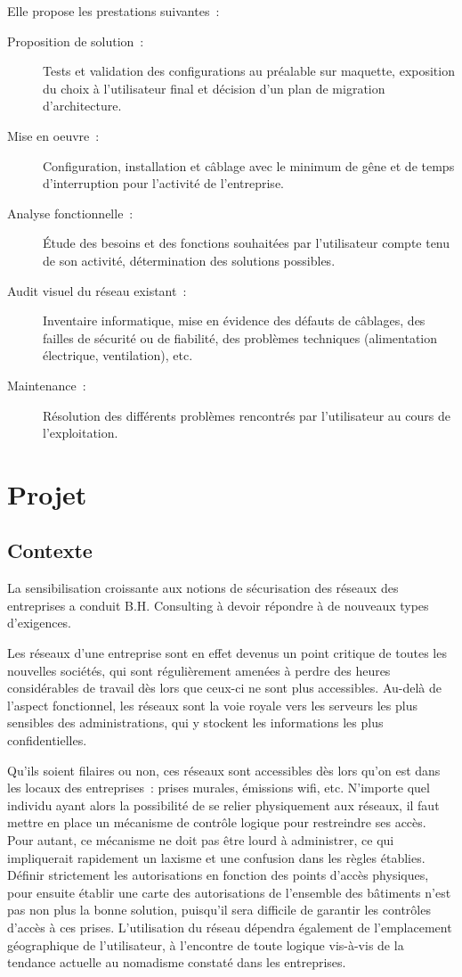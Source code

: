 Elle propose les prestations suivantes~:

\begin{description}
\item[Proposition de solution~:] Tests et validation des configurations au préalable sur maquette, exposition du choix à l’utilisateur final et décision d’un plan de migration d’architecture.
\item[Mise en oeuvre~:] Configuration, installation et câblage avec le minimum de gêne et de temps d’interruption pour l’activité de l’entreprise.
\item[Analyse fonctionnelle~:] Étude des besoins et des fonctions souhaitées par l’utilisateur compte tenu de son activité, détermination des solutions possibles.
\item[Audit visuel du réseau existant~:] Inventaire informatique, mise en évidence des défauts de câblages, des failles de sécurité ou de fiabilité, des problèmes techniques (alimentation électrique, ventilation), etc.
\item[Maintenance~:] Résolution des différents problèmes rencontrés par l’utilisateur au cours de l’exploitation.
\end{description}

\section{Projet}
\subsection{Contexte}

La sensibilisation croissante aux notions de sécurisation des réseaux des entreprises a conduit B.H. Consulting à devoir répondre à de nouveaux types d'exigences.

Les réseaux d'une entreprise sont en effet devenus un point critique de toutes les nouvelles sociétés, qui sont régulièrement amenées à perdre des heures considérables de travail dès lors que ceux-ci ne sont plus accessibles. Au-delà de l'aspect fonctionnel, les réseaux sont la voie royale vers les serveurs les plus sensibles des administrations, qui y stockent les informations les plus confidentielles.

Qu'ils soient filaires ou non, ces réseaux sont accessibles dès lors qu'on est dans les locaux des entreprises~: prises murales, émissions wifi, etc. N'importe quel individu ayant alors la possibilité de se relier physiquement aux réseaux, il faut mettre en place un mécanisme de contrôle logique pour restreindre ses accès. Pour autant, ce mécanisme ne doit pas être lourd à administrer, ce qui impliquerait rapidement un laxisme et une confusion dans les règles établies. Définir strictement les autorisations en fonction des points d'accès physiques, pour ensuite établir une carte des autorisations de l'ensemble des bâtiments n'est pas non plus la bonne solution, puisqu'il sera difficile de garantir les contrôles d'accès à ces prises. L'utilisation du réseau dépendra également de l'emplacement géographique de l'utilisateur, à l'encontre de toute logique vis-à-vis de la tendance actuelle au nomadisme constaté dans les entreprises.

